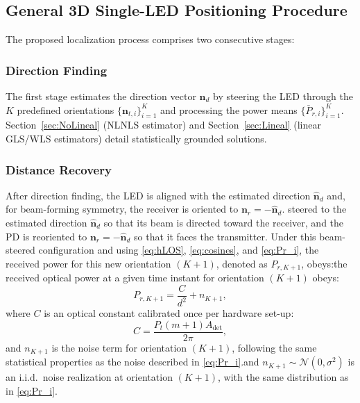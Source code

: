 \documentclass[journal]{IEEEtran}
\newcommand{\added}[1]{{\color{blue}#1}}
\newcommand{\deleted}[1]{{\color{red}#1}}
\begin{document}
\subsection{General 3D Single-LED Positioning Procedure}

The proposed localization process comprises two consecutive stages:

\subsubsection{Direction Finding}

The first stage estimates the direction vector \(\mathbf{n}_{d}\) by steering the LED through the
\(K\) predefined orientations \(\{\mathbf{n}_{t,i}\}_{i=1}^{K}\) and processing
the power means \(\{\bar P_{r,i}\}_{i=1}^{K}\).  
Section~\ref{sec:NoLineal} (\deleted{NL}\added{NLS} estimator) and Section~\ref{sec:Lineal} (linear GLS/WLS estimators) detail statistically grounded solutions.

\subsubsection{Distance Recovery}

After direction finding, the LED is \deleted{aligned with the estimated direction
$\hat{\mathbf{n}}_{d}$ and, for beam-forming symmetry, the receiver is oriented to
$\mathbf{n}_{r}=-\hat{\mathbf{n}}_{d}$.} \added{steered to the estimated direction $\hat{\mathbf{n}}_{d}$ so that its beam is directed toward the receiver, and the PD is reoriented to $\mathbf{n}_r = -\hat{\mathbf{n}}_d$ so that it faces the transmitter.} 
Under this beam-steered configuration and using \eqref{eq:hLOS}, \eqref{eq:cosines}, and \eqref{eq:Pr_i},
\deleted{the received power for this new orientation $(K+1)$, denoted as $P_{r,K+1}$, obeys:}\added{the received optical power at a given time instant for orientation $(K+1)$ obeys:}
\begin{equation}
P_{r,K+1}= \frac{C}{d^{2}}+n_{K+1},
\label{eq:beamSteeredMean}
\end{equation}
where \(C\) is an optical constant calibrated once per hardware set-up:
\begin{equation}
C = \frac{P_{t}(m+1)A_{\text{det}}}{2\pi},
\label{eq:constant_C}
\end{equation} 
\deleted{and $n_{K+1}$ is the noise term for orientation $(K+1)$, following the same statistical properties as the noise described in \eqref{eq:Pr_i}.}\added{and $n_{K+1}\sim\mathcal{N}(0,\sigma^{2})$ is an i.i.d.\ noise realization at orientation $(K+1)$, with the same distribution as in \eqref{eq:Pr_i}.}
\end{document}
